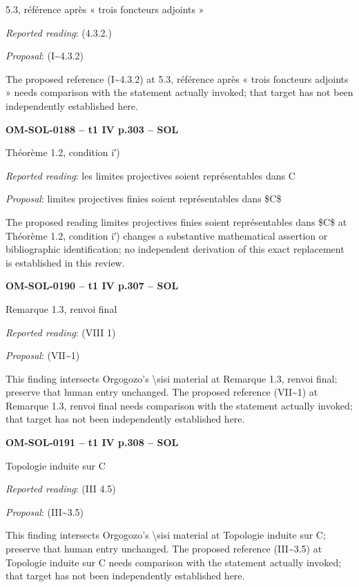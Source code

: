 5.3, référence après « trois foncteurs adjoints »\par
\emph{Reported reading}: (4.3.2.)\par
\emph{Proposal}: (I\textasciitilde{}4.3.2)\par
The proposed reference (I\textasciitilde{}4.3.2) at 5.3, référence après « trois foncteurs adjoints » needs comparison with the statement actually invoked; that target has not been independently established here.\par
\par\noindent\textbf{OM-SOL-0188 -- t1 IV p.303 -- SOL}\par
Théorème 1.2, condition i′)\par
\emph{Reported reading}: les limites projectives soient représentables dans C\par
\emph{Proposal}: limites projectives finies soient représentables dans \$C\$\par
The proposed reading limites projectives finies soient représentables dans \$C\$ at Théorème 1.2, condition i′) changes a substantive mathematical assertion or bibliographic identification; no independent derivation of this exact replacement is established in this review.\par
\par\noindent\textbf{OM-SOL-0190 -- t1 IV p.307 -- SOL}\par
Remarque 1.3, renvoi final\par
\emph{Reported reading}: (VIII 1)\par
\emph{Proposal}: (VII\textasciitilde{}1)\par
This finding intersects Orgogozo's \textbackslash{}sisi material at Remarque 1.3, renvoi final; preserve that human entry unchanged. The proposed reference (VII\textasciitilde{}1) at Remarque 1.3, renvoi final needs comparison with the statement actually invoked; that target has not been independently established here.\par
\par\noindent\textbf{OM-SOL-0191 -- t1 IV p.308 -- SOL}\par
Topologie induite sur C\par
\emph{Reported reading}: (III 4.5)\par
\emph{Proposal}: (III\textasciitilde{}3.5)\par
This finding intersects Orgogozo's \textbackslash{}sisi material at Topologie induite sur C; preserve that human entry unchanged. The proposed reference (III\textasciitilde{}3.5) at Topologie induite sur C needs comparison with the statement actually invoked; that target has not been independently established here.\par
